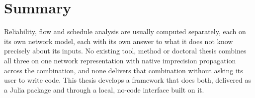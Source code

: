 \documentclass[12pt]{report}
\begin{document}
\section{Summary}
\label{sec:intro-summary}

Reliability, flow and schedule analysis are usually computed separately, each on its own network
model, each with its own answer to what it does not know precisely about its inputs. No existing
tool, method or doctoral thesis combines all three on one network representation with native
imprecision propagation across the combination, and none delivers that combination without asking
its user to write code. This thesis develops a framework that does both, delivered as a Julia
package and through a local, no-code interface built on it.

\ifdefined\maindoc
\else
\printbibliography
\end{document}
